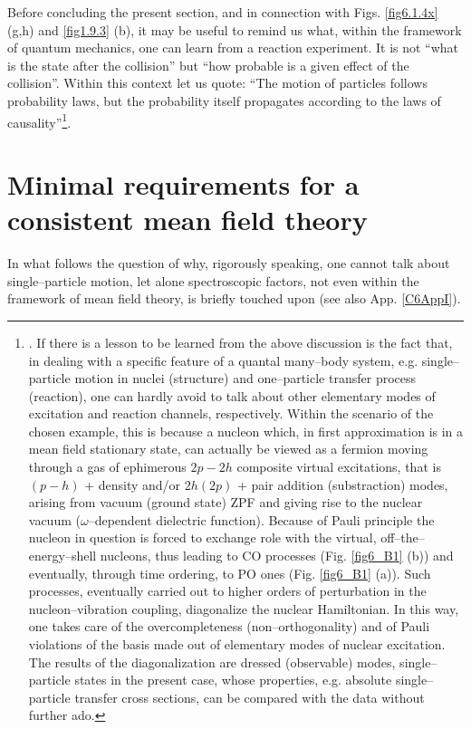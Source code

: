  Before concluding the present section, and in connection with Figs. \ref{fig6.1.4x} (g,h) and \ref{fig1.9.3} (b), it may be useful to remind us what, within the framework of quantum mechanics, one can learn from a reaction experiment. It is not ``what is the state after the collision'' but ``how probable is a given effect of the collision''. Within this context let us quote: ``The motion of particles follows probability laws, but the probability itself propagates according to the laws of causality''\footnote{\cite{Born:26}. If there is a lesson to be learned from the above discussion is the fact that, in dealing with a specific feature of a quantal many--body system, e.g. single--particle motion in nuclei (structure) and one--particle transfer process (reaction), one can hardly avoid to talk about other elementary modes of excitation and  reaction channels, respectively. Within the scenario of the chosen example, this is because a nucleon which, in first approximation is in a mean field stationary state, can actually be viewed as a fermion moving through a gas of ephimerous $2p-2h$ composite virtual excitations, that is $(p-h)$ + density and/or $2h(2p)$ + pair addition (substraction) modes, arising from vacuum (ground state) ZPF and giving rise to the nuclear vacuum ($\omega$--dependent dielectric function). Because of Pauli principle \citep{Pauli:47} the nucleon in question is forced to exchange role with the virtual, off--the--energy--shell nucleons, thus leading to CO processes (Fig. \ref{fig6_B1} (b)) and eventually, through time ordering, to PO ones (Fig. \ref{fig6_B1} (a)). Such processes, eventually carried out to higher orders of perturbation in the nucleon--vibration coupling, diagonalize the nuclear Hamiltonian. In this way, one takes care of the overcompleteness (non--orthogonality) and of Pauli violations of the basis made out of elementary modes of nuclear excitation. The results of the diagonalization  are dressed (observable) modes, single--particle states in the present case, whose properties, e.g. absolute single--particle transfer cross sections, can be compared with the data without further ado.}.






\section[Minimal mean field theory]{Minimal requirements for a consistent mean field theory}\label{C6AppA}
In what follows the question of why, rigorously speaking, one cannot talk about single--particle motion, let alone spectroscopic factors, not even within the framework of mean field theory, is briefly touched upon (see also App. \ref{C6AppI}).
	

